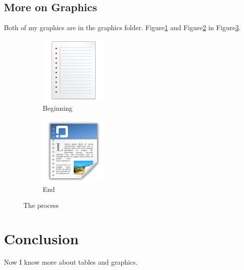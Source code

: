 \documentclass{proc}
\begin{document}
\subsection{More on Graphics}

Both of my graphics are in the graphics folder. Figure\ref{fig:paper} and Figure\ref{fig:page} in Figure\ref{fig:subs}.

\begin{figure}[htbp]
\centering %
\begin{subfigure}[b]{0.2\textwidth}
	\centering
	\includegraphics[scale=.5]{paper.png} %
	\caption{Beginning}
	\label{fig:paper}
\end{subfigure}%
\begin{subfigure}[b]{0.2\textwidth}
	\centering
	\includegraphics[scale=.5]{page.png} %
	\caption{End}
	\label{fig:page}
\end{subfigure}%
\caption{The process}
\label{fig:subs}
\end{figure}



\section{Conclusion}

Now I know more about tables and graphics.
\end{document}
